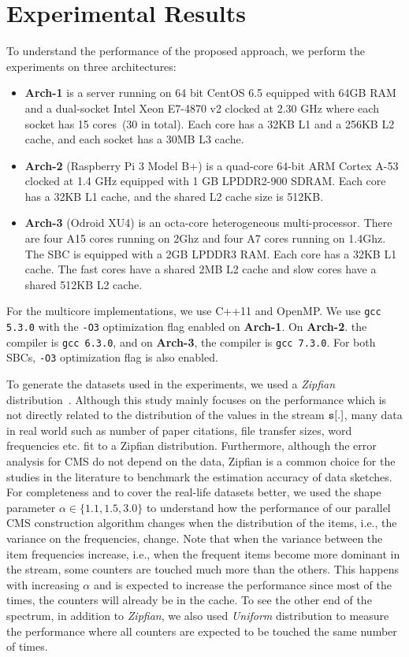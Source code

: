 \documentclass[10pt, review=true,sigconf]{acmart}
\begin{document}
\section{Experimental Results}\label{sec:exp}

To understand the performance of the proposed approach, we perform the experiments on three architectures: 
\begin{itemize}[leftmargin=*]
\item {\bf Arch-1} is a server running on 64 bit CentOS 6.5 equipped with 64GB RAM and a dual-socket Intel Xeon E7-4870 v2 clocked at 2.30 GHz where each socket has 15 cores~(30 in total). Each core has a 32KB L1 and a 256KB L2 cache, and each socket has a 30MB L3 cache. 
\item {\bf Arch-2} (Raspberry Pi 3 Model B+) is a quad-core 64-bit ARM Cortex A-53 clocked at 1.4 GHz equipped with 1 GB LPDDR2-900 SDRAM.  Each core has a 32KB L1 cache, and the shared L2 cache size is 512KB.
\item {\bf Arch-3} (Odroid XU4) is an octa-core heterogeneous multi-processor. There are four A15 cores running on 2Ghz and four A7 cores running on 1.4Ghz. The SBC is equipped with a 2GB LPDDR3 RAM. Each core has a 32KB L1 cache. The fast cores have a shared 2MB L2 cache and slow cores have a shared 512KB L2 cache. 
\end{itemize}
For the multicore implementations, we use C++11 and OpenMP. We use {\tt gcc 5.3.0} with the {\tt -O3} optimization flag enabled on {\bf Arch-1}. On {\bf Arch-2}. the compiler is {\tt gcc 6.3.0}, and on {\bf Arch-3}, the compiler is {\tt gcc 7.3.0}. For both SBCs, {\tt -O3} optimization flag is also enabled.

To generate the datasets used in the experiments, we used a {\em Zipfian} distribution~\cite{Zipf1935}. Although this study mainly focuses on the performance which is not directly related to the distribution of the values in the stream ${\tt s}[.]$, many data in real world such as number of paper citations, file transfer sizes, word frequencies etc. fit to a Zipfian distribution. Furthermore, although the error analysis for CMS do not depend on the data, Zipfian is a common choice for the studies in the literature to benchmark the estimation accuracy of data sketches. For completeness and to cover the real-life datasets better, we used the shape parameter $\alpha \in \{1.1, 1.5, 3.0\}$ to understand how the performance of our parallel CMS construction algorithm changes when the distribution of the items, i.e., the variance on the frequencies, change. Note that when the variance between
the item frequencies increase, i.e., when the frequent items become more dominant in the stream, some counters are touched much more than the others. This happens with increasing $\alpha$ and is expected to increase the performance since most of the times, the counters will already be in the cache. To see the other end of the spectrum, in addition to {\em Zipfian}, we also used {\em Uniform} distribution to measure the performance where all counters are expected to be touched the same number of times. 
\end{document}
